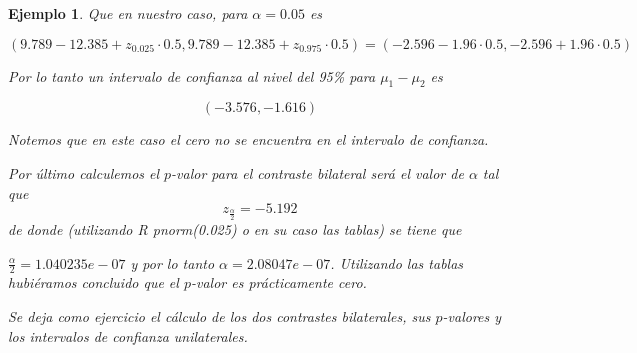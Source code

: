 \documentclass[12pt]{report}
\newtheorem{example}[definition]{Ejemplo}
\begin{document}
\begin{example}
Que en nuestro caso, para $\alpha=0.05$ es 

$$\left(9.789-12.385
+z_{0.025}\cdot{0.5},
9.789-12.385
+z_{0.975}\cdot {0.5}\right)= \left(-2.596-1.96\cdot 0.5,  -2.596+1.96\cdot 0.5\right)$$

Por lo tanto un intervalo de confianza al nivel del 95\% para $\mu_1-\mu_2$
 es 
 
 $$\left(  -3.576 ,  -1.616\right)$$
 
 Notemos que en este caso el cero no se encuentra en el intervalo de confianza.
 
 Por último calculemos el $p$-valor para el contraste bilateral será el valor de $\alpha$ tal que 
$$z_{\frac{\alpha}{2}}=-5.192 $$ de donde  (utilizando R  pnorm(0.025) o en su caso las tablas) se tiene que 

 $\frac{\alpha}{2}= 1.040235 e-07$ y por lo tanto $\alpha=2.08047 e-07$. Utilizando las tablas hubiéramos concluido que el $p$-valor es prácticamente cero.
 
 
 Se deja como ejercicio el cálculo de los dos contrastes bilaterales, sus $p$-valores y los intervalos de confianza unilaterales.
\end{example}
\end{document}
